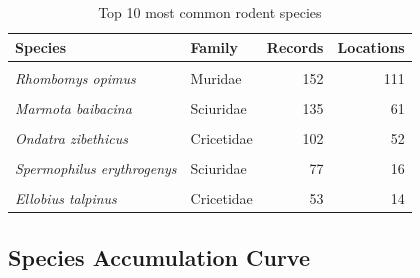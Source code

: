 \documentclass[
]{article}
\begin{document}
\begin{longtable}[t]{>{}llrr}
\caption{\label{tab:species-inventory}Top 10 most common rodent species}\\
\toprule
Species & Family & Records & Locations\\
\midrule
\em{\cellcolor{gray!10}{Sciurus vulgaris}} & \cellcolor{gray!10}{Sciuridae} & \cellcolor{gray!10}{334} & \cellcolor{gray!10}{110}\\
\em{Rhombomys opimus} & Muridae & 152 & 111\\
\em{\cellcolor{gray!10}{Apodemus agrarius}} & \cellcolor{gray!10}{Muridae} & \cellcolor{gray!10}{137} & \cellcolor{gray!10}{133}\\
\em{Marmota baibacina} & Sciuridae & 135 & 61\\
\em{\cellcolor{gray!10}{Marmota bobak}} & \cellcolor{gray!10}{Sciuridae} & \cellcolor{gray!10}{110} & \cellcolor{gray!10}{87}\\
\addlinespace
\em{Ondatra zibethicus} & Cricetidae & 102 & 52\\
\em{\cellcolor{gray!10}{Spermophilus fulvus}} & \cellcolor{gray!10}{Sciuridae} & \cellcolor{gray!10}{81} & \cellcolor{gray!10}{71}\\
\em{Spermophilus erythrogenys} & Sciuridae & 77 & 16\\
\em{\cellcolor{gray!10}{Allactaga elater}} & \cellcolor{gray!10}{Dipodidae} & \cellcolor{gray!10}{58} & \cellcolor{gray!10}{21}\\
\em{Ellobius talpinus} & Cricetidae & 53 & 14\\
\bottomrule
\end{longtable}
\endgroup{}

\subsection{Species Accumulation
Curve}\label{species-accumulation-curve}
\end{document}
